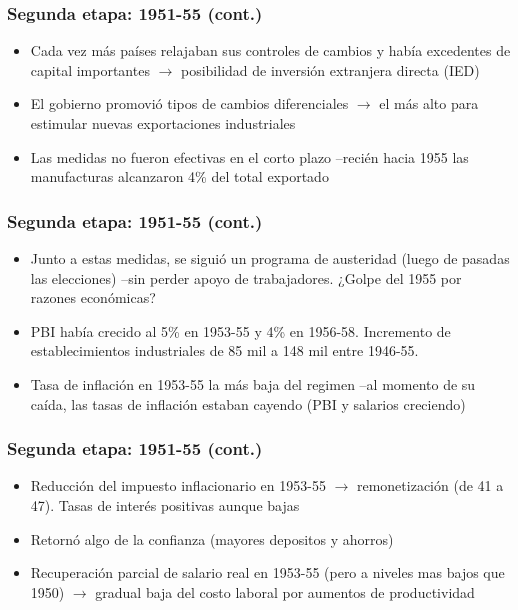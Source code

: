 \documentclass[14pt,aspectratio=169]{beamer}
\begin{document}
                  \begin{frame}\frametitle{Segunda etapa: 1951-55 (cont.)}
  \begin{itemize}\itemsep 10pt
      \item Cada vez más países relajaban sus controles de cambios y
        había excedentes de capital importantes $\longrightarrow$
        posibilidad de inversión extranjera directa (IED)
      \item El gobierno promovió tipos de cambios diferenciales
        $\longrightarrow$ el más alto para estimular nuevas
        exportaciones industriales
        \item Las medidas no fueron efectivas en el corto plazo
          --recién hacia 1955 las manufacturas alcanzaron 4\% del
          total exportado
                 \end{itemize}
               \end{frame}
               

  \begin{frame}\frametitle{Segunda etapa: 1951-55 (cont.)}
  \begin{itemize}\itemsep 10pt
      \item Junto a estas medidas, se siguió un programa de austeridad
        (luego de pasadas las elecciones) --sin perder apoyo de
        trabajadores. ¿Golpe del 1955 por razones económicas?
        \item PBI había crecido al 5\% en 1953-55 y 4\% en
          1956-58. Incremento de establecimientos industriales de 85
          mil a 148 mil entre 1946-55.
          \item Tasa de inflación en 1953-55 la más baja del regimen
            --al momento de su caída, las tasas de inflación estaban
            cayendo (PBI y salarios creciendo)           
                 \end{itemize}
               \end{frame}


  \begin{frame}\frametitle{Segunda etapa: 1951-55 (cont.)}
  \begin{itemize}\itemsep 10pt
      \item Reducción del impuesto inflacionario en 1953-55
        $\longrightarrow$ remonetización (de 41 a 47). Tasas de
        interés positivas aunque bajas
        \item Retornó algo de la confianza (mayores depositos y
          ahorros)
          \item Recuperación parcial de salario real en 1953-55 (pero
            a niveles mas bajos que 1950) $\longrightarrow$ gradual
            baja del costo laboral por aumentos de productividad
                 \end{itemize}
               \end{frame}
               
\end{document}
